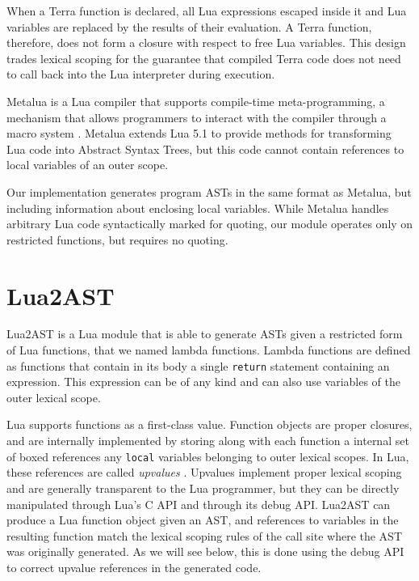 \documentclass[english]{llncs}
\begin{document}
When a Terra function is declared, all Lua expressions escaped inside it
and Lua variables are replaced by the results of their evaluation.
A Terra function, therefore, does not form a closure with
respect to free Lua variables. This design trades lexical scoping for the
guarantee that compiled Terra code does not need to call back into the Lua
interpreter during execution.

Metalua \cite{metalua} is a Lua compiler that supports compile-time
meta-programming, a mechanism that allows programmers to interact
with the compiler through a macro system \cite{Fleutot2007contrasting}.
Metalua extends Lua 5.1 to provide methods for transforming Lua
code into Abstract Syntax Trees, but this code cannot contain
references to local variables of an outer scope.

Our implementation generates program ASTs in the same format as
Metalua, but including information about enclosing local variables. While Metalua
handles arbitrary Lua code syntactically marked for quoting, our module
operates only on restricted functions, but requires no quoting.

\section{Lua2AST}
\label{sec:lua2ast}



Lua2AST is a Lua module that is able to generate ASTs given a restricted form of Lua functions, that we named lambda functions.
Lambda functions are defined as functions that contain in its body a single \texttt{return} statement containing an expression.
This expression can be of any kind and can also use variables of the outer lexical scope.

Lua supports functions as a first-class value. Function objects are proper closures, and are internally implemented by
storing along with each function a internal set of boxed references any \texttt{local} variables belonging to outer
lexical scopes. In Lua, these references are called \emph{upvalues} \cite{Ierusalimschy2006PIL}.
Upvalues implement proper lexical scoping and are generally transparent to the Lua programmer,
but they can be directly manipulated through Lua's C API and through its debug API.
Lua2AST can produce a Lua function object given an AST, and references to variables
in the resulting function match the lexical scoping rules of the call site where the
AST was originally generated. As we will see below, this is done using the debug API
to correct upvalue references in the generated code.
\end{document}
